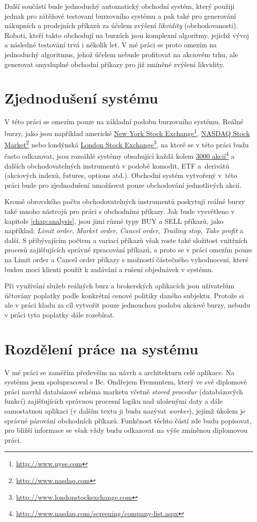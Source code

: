 \documentclass[thesis=M,czech]{FITthesis}[2012/06/26]
\newcommand\fnurl[2]{\href{#2}{#1}\footnote{\url{#2}}}
\begin{document}
	Další součástí bude jednoduchý automatický obchodní systém, který použiji jednak pro zátěžové testovaní burzovního systému a pak také pro generování nákupních a prodejních příkazů za účelem zvýšení \textit{likvidity} (obchodovanosti). Roboti, kteří takto obchodují na burzách jsou komplexní algoritmy, jejichž vývoj a následné testování trvá i několik let. V mé práci se proto omezím na jednoduchý algoritmus, jehož účelem nebude profitovat na akciovém trhu, ale generovat smysluplné obchodní příkazy pro již zmíněné zvýšení likvidity.
	
	
\section{Zjednodušení systému}
	
	V této práci se omezím pouze na základní podobu burzovního systému. Reálné burzy, jako jsou například americké \fnurl{New York Stock Exchange}{http://www.nyse.com}, \fnurl{NASDAQ Stock Market}{http://www.nasdaq.com} nebo londýnská \fnurl{London Stock Exchange}{http://www.londonstockexchange.com}, na které se v této práci budu často odkazovat, jsou rozsáhlé systémy obsahující každá kolem \fnurl{3000 akcií}{http://www.nasdaq.com/screening/company-list.aspx} a dalších obchodovatelných instrumentů v podobě komodit, ETF a~derivátů (akciových indexů, futures, options atd.). Obchodní systém vytvořený v~této práci bude pro zjednodušení umožňovat pouze obchodování jednotlivých akcií. 
	
	Kromě obrovského počtu obchodovatelných instrumentů poskytují reálné burzy také mnoho nástrojů pro práci s obchodními příkazy. Jak bude vysvětleno v kapitole \ref{chap:analysis}, jsou jimi různé typy BUY a SELL příkazů, jako například: \textit{Limit order}, \textit{Market order}, \textit{Cancel order}, \textit{Trailing stop}, \textit{Take profit} a další. S přibývajícím počtem a variací příkazů však roste také složitost vnitřních procesů zajišťujících správné zpracování příkazů, a proto se v práci omezím pouze na Limit order a Cancel order příkazy s možností částečného vyhodnocení, které budou moci klienti použít k zadávání a rušení objednávek v systému.

	Při využívání služeb reálných burz a brokerských aplikacích jsou uživatelům účtovány poplatky podle konkrétní cenové politiky daného subjektu. Protože si ale v práci kladu za cíl vytvořit pouze jednouchou podobu akciové burzy, nebudu v práci tyto poplatky dále rozebírat.

\section{Rozdělení práce na systému}
	V mé práci se zaměřím především na návrh a architekturu celé aplikace. Na  systému jsem spolupracoval s Bc. Ondřejem Fremuntem, který ve své diplomové práci\cite{Fremunt2014} navrhl databázové schéma marketu včetně \textit{stored procedur} (databázových funkcí) zajišťujících správnou procesní logiku nad uloženými daty a dále samostatnou aplikaci (v dalším textu ji budu nazývat \textit{worker}), jejímž úkolem je správné párování obchodních příkazů. Funkčnost těchto částí zde budu popisovat, pro bližší informace se však vždy budu odkazovat na výše zmíněnou diplomovou práci.
\end{document}
